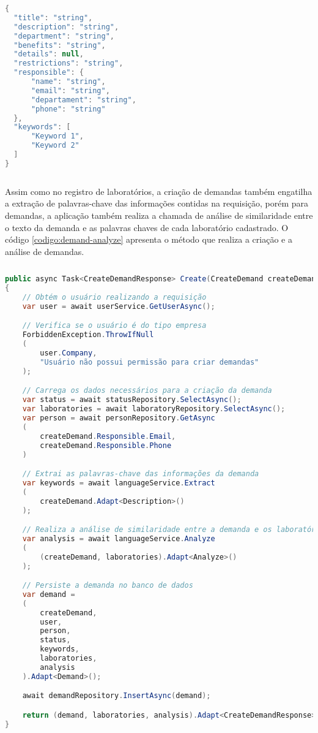 \begin{sourcecode}[H]
  \caption{\label{codigo:create-demand}Corpo JSON de registro de demandas}
  \begin{lstlisting}[frame=single, language=Java]
{
  "title": "string",
  "description": "string",
  "department": "string",
  "benefits": "string",
  "details": null,
  "restrictions": "string",
  "responsible": {
      "name": "string",
      "email": "string",
      "departament": "string",
      "phone": "string"
  },
  "keywords": [
      "Keyword 1",
      "Keyword 2"
  ]
}
\end{lstlisting}
  \fonte{}
\end{sourcecode}

Assim como no registro de laboratórios, a criação de demandas também engatilha a extração de palavras-chave das informações contidas na requisição, porém para demandas, a aplicação também realiza a chamada de análise de similaridade entre o texto da demanda e as palavras chaves de cada laboratório cadastrado. O código \ref{codigo:demand-analyze} apresenta o método que realiza a criação e a análise de demandas.

\begin{sourcecode}[H]
  \caption{\label{codigo:demand-analyze}Método de cadastro e análise de demandas}
  \begin{lstlisting}[frame=single, language=Java]
public async Task<CreateDemandResponse> Create(CreateDemand createDemand)
{
    // Obtém o usuário realizando a requisição
    var user = await userService.GetUserAsync();

    // Verifica se o usuário é do tipo empresa
    ForbiddenException.ThrowIfNull
    (
        user.Company, 
        "Usuário não possui permissão para criar demandas"
    );

    // Carrega os dados necessários para a criação da demanda
    var status = await statusRepository.SelectAsync();
    var laboratories = await laboratoryRepository.SelectAsync();
    var person = await personRepository.GetAsync
    (
        createDemand.Responsible.Email, 
        createDemand.Responsible.Phone
    )

    // Extrai as palavras-chave das informações da demanda
    var keywords = await languageService.Extract
    (
        createDemand.Adapt<Description>()
    );

    // Realiza a análise de similaridade entre a demanda e os laboratórios
    var analysis = await languageService.Analyze
    (
        (createDemand, laboratories).Adapt<Analyze>()
    );

    // Persiste a demanda no banco de dados
    var demand = 
    (
        createDemand, 
        user, 
        person, 
        status, 
        keywords, 
        laboratories, 
        analysis
    ).Adapt<Demand>();

    await demandRepository.InsertAsync(demand);

    return (demand, laboratories, analysis).Adapt<CreateDemandResponse>();
}
\end{lstlisting}
  \fonte{}
\end{sourcecode}

